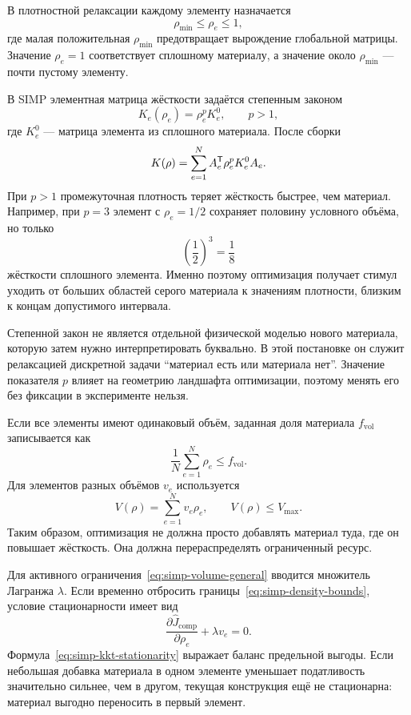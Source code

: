 В плотностной релаксации каждому элементу назначается
\begin{equation}
\label{eq:simp-density-bounds}
 \rho_{\min}\leq \rho_e\leq 1,
\end{equation}
где малая положительная $\rho_{\min}$ предотвращает вырождение глобальной матрицы. Значение $\rho_e=1$ соответствует сплошному материалу, а значение около $\rho_{\min}$ --- почти пустому элементу.

В SIMP элементная матрица жёсткости задаётся степенным законом
\begin{equation}
 K_e(\rho_e)
 =
 \rho_e^p K_e^0,
 \qquad p>1,
\end{equation}
где $K_e^0$ --- матрица элемента из сплошного материала. После сборки
\begin{equation}
\label{eq:simp-global-stiffness}
 K(\rho)
 =
 \sum_{e=1}^{N}
 A_e^{\mathsf{T}}\rho_e^pK_e^0A_e.
\end{equation}
При $p>1$ промежуточная плотность теряет жёсткость быстрее, чем материал. Например, при $p=3$ элемент с $\rho_e=1/2$ сохраняет половину условного объёма, но только
\begin{equation}
 \left(\frac12\right)^3=\frac18
\end{equation}
жёсткости сплошного элемента. Именно поэтому оптимизация получает стимул уходить от больших областей серого материала к значениям плотности, близким к концам допустимого интервала.

Степенной закон не является отдельной физической моделью нового материала, которую затем нужно интерпретировать буквально. В этой постановке он служит релаксацией дискретной задачи ``материал есть или материала нет''. Значение показателя $p$ влияет на геометрию ландшафта оптимизации, поэтому менять его без фиксации в эксперименте нельзя.

Если все элементы имеют одинаковый объём, заданная доля материала $f_{\mathrm{vol}}$ записывается как
\begin{equation}
 \frac1N\sum_{e=1}^{N}\rho_e
 \leq
 f_{\mathrm{vol}}.
\end{equation}
Для элементов разных объёмов $v_e$ используется
\begin{equation}
\label{eq:simp-volume-general}
 V(\rho)
 =
 \sum_{e=1}^{N}v_e\rho_e,
 \qquad
 V(\rho)\leq V_{\max}.
\end{equation}
Таким образом, оптимизация не должна просто добавлять материал туда, где он повышает жёсткость. Она должна перераспределять ограниченный ресурс.

Для активного ограничения~\eqref{eq:simp-volume-general} вводится множитель Лагранжа $\lambda$. Если временно отбросить границы~\eqref{eq:simp-density-bounds}, условие стационарности имеет вид
\begin{equation}
\label{eq:simp-kkt-stationarity}
 \frac{\partial \widehat J_{\mathrm{comp}}}{\partial\rho_e}
 +
 \lambda v_e
 =0.
\end{equation}
Формула~\eqref{eq:simp-kkt-stationarity} выражает баланс предельной выгоды. Если небольшая добавка материала в одном элементе уменьшает податливость значительно сильнее, чем в другом, текущая конструкция ещё не стационарна: материал выгодно переносить в первый элемент.

